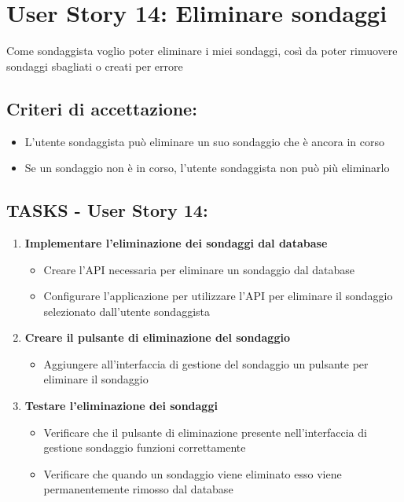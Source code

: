\section*{User Story 14: Eliminare sondaggi}
    Come sondaggista voglio poter eliminare i miei sondaggi, così da poter rimuovere sondaggi sbagliati o creati per errore
    \subsection*{Criteri di accettazione:}  
    \begin{itemize}  
        \item L'utente sondaggista può eliminare un suo sondaggio che è ancora in corso 
        \item Se un sondaggio non è in corso, l'utente sondaggista non può più eliminarlo
    \end{itemize}  
    \subsection*{TASKS - User Story 14:}  
    \begin{enumerate}  
        \item \textbf{Implementare l'eliminazione dei sondaggi dal database}  
            \begin{itemize}  
                \item Creare l'API necessaria per eliminare un sondaggio dal database
                \item Configurare l'applicazione per utilizzare l'API per eliminare il sondaggio selezionato dall'utente sondaggista
            \end{itemize} 
        \item \textbf{Creare il pulsante di eliminazione del sondaggio}  
            \begin{itemize}  
                \item Aggiungere all'interfaccia di gestione del sondaggio un pulsante per eliminare il sondaggio
            \end{itemize} 
        \item \textbf{Testare l'eliminazione dei sondaggi}  
            \begin{itemize}  
                \item Verificare che il pulsante di eliminazione presente nell'interfaccia di gestione sondaggio funzioni correttamente
                \item Verificare che quando un sondaggio viene eliminato esso viene permanentemente rimosso dal database
            \end{itemize} 
    \end{enumerate}
